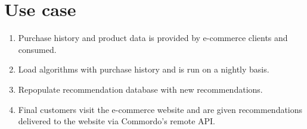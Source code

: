 
\section{Use case}\label{sec:use}

\begin{enumerate}
    \item Purchase history and product data is provided by e-commerce clients and consumed.
    \item Load algorithms with purchase history and is run on a nightly basis.
    \item Repopulate recommendation database with new recommendations.
    \item Final customers visit the e-commerce website and are given recommendations delivered to the website via Commordo's remote API.
\end{enumerate}

